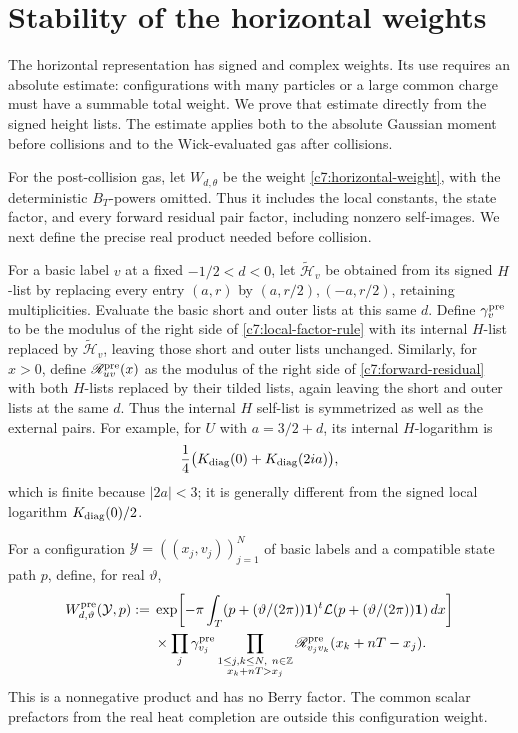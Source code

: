 \section{Stability of the horizontal weights}\label{c7:stability}

The horizontal representation has signed and complex weights. Its use requires an absolute estimate: configurations with many particles or a large common charge must have a summable total weight. We prove that estimate directly from the signed height lists. The estimate applies both to the absolute Gaussian moment before collisions and to the Wick-evaluated gas after collisions.

For the post-collision gas, let \(W_{d,\theta}\) be the weight \eqref{c7:horizontal-weight}, with the deterministic \(B_T\)-powers omitted. Thus it includes the local constants, the state factor, and every forward residual pair factor, including nonzero self-images. We next define the precise real product needed before collision.

For a basic label \(v\) at a fixed \(-1/2<d<0\), let \(\widetilde{\mathscr H}_v\) be obtained from its signed \(H\)-list by replacing every entry \((a,r)\) by \((a,r/2),(-a,r/2)\), retaining multiplicities. Evaluate the basic short and outer lists at this same \(d\). Define \(\gamma_v^{\rm pre}\) to be the modulus of the right side of \eqref{c7:local-factor-rule} with its internal \(H\)-list replaced by \(\widetilde{\mathscr H}_v\), leaving those short and outer lists unchanged. Similarly, for \(x>0\), define \(\mathscr R^{\rm pre}_{uv}(x)\) as the modulus of the right side of \eqref{c7:forward-residual} with both \(H\)-lists replaced by their tilded lists, again leaving the short and outer lists at the same \(d\). Thus the internal \(H\) self-list is symmetrized as well as the external pairs. For example, for \(U\) with \(a=3/2+d\), its internal \(H\)-logarithm is
\[
\frac14\bigl(K_{\rm diag}(0)+K_{\rm diag}(2ia)\bigr),
\]
which is finite because \(|2a|<3\); it is generally different from the signed local logarithm \(K_{\rm diag}(0)/2\).

For a configuration \(\mathcal Y=((x_j,v_j))_{j=1}^N\) of basic labels and a compatible state path \(p\), define, for real \(\vartheta\),
\begin{equation}\label{j:pre-weight}
\begin{aligned}
W^{\rm pre}_{d,\vartheta}(\mathcal Y,p)
:={}&\exp\!\left[-\pi\int_T
(p+(\vartheta/(2\pi))\mathbf1)^t\mathcal L
(p+(\vartheta/(2\pi))\mathbf1)\,dx\right]\\
&\times\prod_j\gamma_{v_j}^{\rm pre}
\prod_{\substack{1\le j,k\le N,\ n\in\mathbb Z\\x_k+nT>x_j}}
\mathscr R^{\rm pre}_{v_jv_k}(x_k+nT-x_j).
\end{aligned}
\end{equation}
This is a nonnegative product and has no Berry factor. The common scalar prefactors from the real heat completion are outside this configuration weight.


